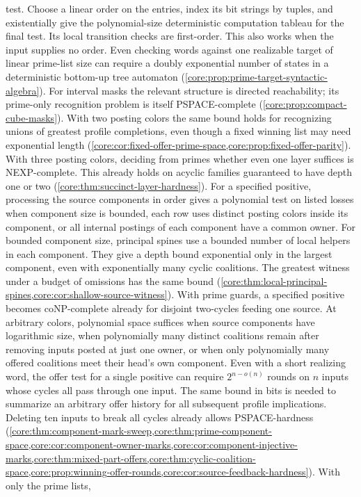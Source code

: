 test. Choose a linear order on the entries, index its bit strings by
tuples, and existentially give the polynomial-size deterministic
computation tableau for the final test. Its local transition checks
are first-order. This also works when the input supplies no order.
Even checking words against one realizable target of linear
prime-list size can require a doubly exponential number of
states in a deterministic bottom-up tree automaton
(\cref{core:prop:prime-target-syntactic-algebra}).
For interval masks the relevant structure is directed reachability; its
prime-only recognition problem is itself PSPACE-complete
(\cref{core:prop:compact-cube-masks}). With two posting colors the same
bound holds for recognizing unions of greatest profile completions,
even though a fixed winning list may need exponential length
(\cref{core:cor:fixed-offer-prime-space,core:prop:fixed-offer-parity}).
With three posting colors, deciding from primes whether even one
layer suffices is NEXP-complete. This already holds on acyclic
families guaranteed to have depth one or two
(\cref{core:thm:succinct-layer-hardness}).
For a specified positive, processing the source components in order
gives a polynomial test on listed losses when component size is
bounded, each row uses distinct posting colors inside its component,
or all internal postings of each component have a common owner.
For bounded component size, principal spines use a bounded number of
local helpers in each component. They give a depth bound exponential
only in the largest component, even with exponentially many cyclic
coalitions. The greatest witness under a budget of omissions has the
same bound
(\cref{core:thm:local-principal-spines,core:cor:shallow-source-witness}).
With prime guards, a specified positive becomes coNP-complete already
for disjoint two-cycles feeding one source.
At arbitrary colors, polynomial space suffices when source components
have logarithmic size, when polynomially many distinct coalitions
remain after removing inputs posted at just one owner, or when only
polynomially many offered coalitions meet their head's own component. Even with a
short realizing word, the offer test for a single positive can require
$2^{n-o(n)}$ rounds on $n$ inputs whose cycles all pass through one
input. The same bound in bits is needed to summarize an arbitrary
offer history for all subsequent profile implications. Deleting ten inputs to break all
cycles already allows PSPACE-hardness
(\cref{core:thm:component-mark-sweep,core:thm:prime-component-space,core:cor:component-owner-marks,core:cor:component-injective-marks,core:thm:mixed-part-offers,core:thm:cyclic-coalition-space,core:prop:winning-offer-rounds,core:cor:source-feedback-hardness}). With only the prime lists,
